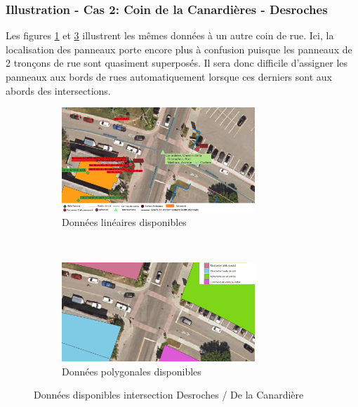     \subsubsection{Illustration - Cas 2: Coin de la Canardières - Desroches}
    Les figures \ref{fig:donnes_panneaux_Desroches} et \ref{fig:donnes_polygone_panneaux_Desroches} illustrent les mêmes données à un autre coin de rue. Ici, la localisation des panneaux porte encore plus à confusion puisque les panneaux de 2 tronçons de rue sont quasiment superposés. Il sera donc difficile d'assigner les panneaux aux bords de rues automatiquement lorsque ces derniers sont aux abords des intersections.
      \begin{figure}[ht]
        \centering
        \begin{subfigure}{\linewidth}
          \centering
          \includegraphics[width=0.8\textwidth]{images/donnees_disponible_Desroches_legende_v2.png}
        \caption{Données linéaires disponibles}
        \label{fig:donnes_panneaux_Desroches}
        \end{subfigure} \\
        \begin{subfigure}{\linewidth}
          \centering
          \includegraphics[width=0.8\textwidth]{images/utilisation_sols_Desroches_v2.png}
        \caption{Données polygonales disponibles}
        \label{fig:donnes_polygone_panneaux_Desroches}
        \end{subfigure}
        \caption{Données disponibles intersection Desroches / De la Canardière}
      \end{figure}
    

